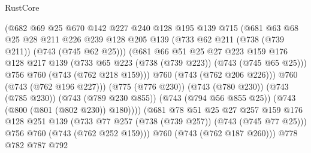 \begin{lexlean}{RustCore}
\begin{coremodule}
                          (@682
                            @69
                            @25
                            @670
                            @142
                            @227
                            @240
                            @128
                            @195
                            @139
                            @715
                            (@681
                              @63
                              @68
                              @25
                              @28
                              @211
                              @226
                              @239
                              @128
                              @205
                              @139
                              (@733 @62 @211 (@738 (@739 @211)) (@743 (@745 @62 @25)))
                              (@681
                                @66
                                @51
                                @25
                                @27
                                @223
                                @159
                                @176
                                @128
                                @217
                                @139
                                (@733 @65 @223 (@738 (@739 @223)) (@743 (@745 @65 @25)))
                                @756
                                @760
                                (@743 (@762 @218 @159)))
                              @760
                              (@743 (@762 @206 @226)))
                            @760
                            (@743 (@762 @196 @227)))
                          (@775 (@776 @230))
                          (@743 (@780 @230))
                          (@743 (@785 @230))
                          (@743 (@789 @230 @855))
                          (@743 (@794 @56 @855 @25))
                          (@743 (@800 (@801 (@802 @230)) @180))))
                      (@681
                        @78
                        @51
                        @25
                        @27
                        @257
                        @159
                        @176
                        @128
                        @251
                        @139
                        (@733 @77 @257 (@738 (@739 @257)) (@743 (@745 @77 @25)))
                        @756
                        @760
                        (@743 (@762 @252 @159)))
                      @760
                      (@743 (@762 @187 @260)))
                    @778
                    @782
                    @787
                    @792

\end{coremodule}
\end{lexlean}
